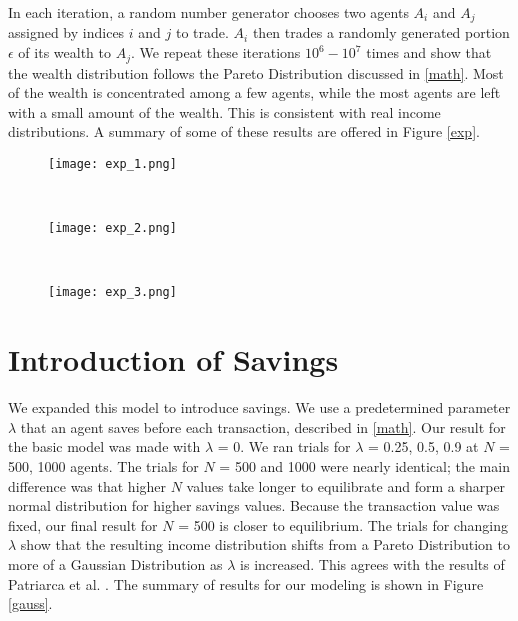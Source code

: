 \documentclass[11pt]{article}
\begin{document}
In each iteration, a random number generator chooses two agents $A_{i}$ and $A_{j}$ assigned by indices $i$ and $j$ to trade. $A_{i}$ then trades a randomly generated portion $\epsilon$ of its wealth to $A_{j}$. We repeat these iterations $10^{6}-10^{7}$ times and show that the wealth distribution follows the Pareto Distribution discussed in \ref{math}. Most of the wealth is concentrated among a few agents, while the most agents are left with a small amount of the wealth. This is consistent with real income distributions. A summary of some of these results are offered in Figure \ref{exp}.

\begin{figure*}[h!]
	\centering
	\begin{subfigure}{0.3\textwidth}
		\centering
		\texttt{[image: exp\_1.png]}
	\end{subfigure}%
	~ 
	\begin{subfigure}{0.3\textwidth}
		\centering
		\texttt{[image: exp\_2.png]}
	\end{subfigure}       
	~ 
	\begin{subfigure}{0.3\textwidth}
		\centering
		\texttt{[image: exp\_3.png]}
	\end{subfigure}
	\caption{The wealth distribution of three trials. The bars are counts for each wealth "bin", while the fit is an exponential decay. These are for various amounts of agents with different amounts of starting wealth. The fit verifies that our model obeys the Pareto Efficiency Law.} 
	\label{exp}
\end{figure*}


\section{Introduction of Savings}

We expanded this model to introduce savings. We use a predetermined parameter $\lambda$ that an agent saves before each transaction, described in \ref{math}. Our result for the basic model was made with $\lambda$ = 0. We ran trials for $\lambda$ = 0.25, 0.5, 0.9 at $N$ = 500, 1000 agents. The trials for $N$ = 500 and 1000 were nearly identical; the main difference was that higher $N$ values take longer to equilibrate and form a sharper normal distribution for higher savings values. Because the transaction value was fixed, our final result for $N$ = 500 is closer to equilibrium. The trials for changing $\lambda$ show that the resulting income distribution shifts from a Pareto Distribution to more of a Gaussian Distribution as $\lambda$ is increased. This agrees with the results of Patriarca et al. \cite{patriarca}. The summary of results for our modeling is shown in Figure \ref{gauss}.
\end{document}
